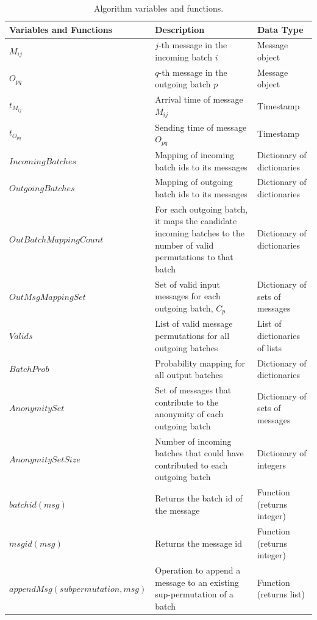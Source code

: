 \documentclass{article}
\begin{document}
\begin{table}[!htbp]
\centering\footnotesize 
\begin{tabular}{l p{5.5cm} p{5.5cm}}
\hline
\textbf{Variables and Functions} & \textbf{Description} & \textbf{Data Type} \\
\hline
$M_{ij}$      & $j$-th message in the incoming batch $i$ & Message object\\
$O_{pq}$      & $q$-th message in the outgoing batch $p$ & Message object\\
$t_{M_{ij}}$  & Arrival time of message $M_{ij}$ & Timestamp  \\
$t_{O_{pq}}$  & Sending time of message $O_{pq}$ & Timestamp  \\
$IncomingBatches$ & Mapping of incoming batch ids to its messages & Dictionary of dictionaries \\
$OutgoingBatches$ & Mapping of outgoing batch ids to its messages & Dictionary of dictionaries \\
$OutBatchMappingCount$ & For each outgoing batch, it maps the candidate incoming batches to the number of valid permutations to that batch & Dictionary of dictionaries \\
$OutMsgMappingSet$ & Set of valid input messages for each outgoing batch, $C_{p}$ & Dictionary of sets of messages \\
$Valids$      & List of valid message permutations for all outgoing batches & List of dictionaries of lists  \\
$BatchProb$ & Probability mapping for all output batches & Dictionary of dictionaries \\
$AnonymitySet$ & Set of messages that contribute to the anonymity of each outgoing batch & Dictionary of sets of messages \\
$AnonymitySetSize$ & Number of incoming batches that could have contributed to each outgoing batch & Dictionary of integers \\
$batchid(msg)$ & Returns the batch id of the message  & Function (returns integer) \\
$msgid(msg)$   & Returns the message id  & Function (returns integer) \\
$appendMsg(subpermutation, msg)$  & Operation to append a message to an existing sup-permutation of a batch  & Function (returns list) \\
\hline
\end{tabular}
\caption{Algorithm variables and functions.} %
\label{tab:variables}
\end{table}
\vspace{1em} 
\end{document}
